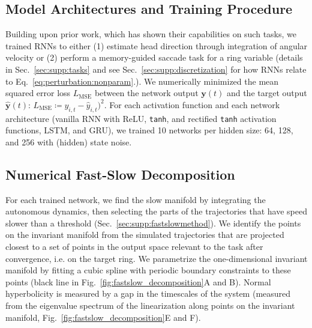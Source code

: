\documentclass{article} %
\newcounter{ct}
\theoremstyle{definition}
\theoremstyle{remark}
\begin{document}
\subsection{Model Architectures and Training Procedure}
Building upon prior work, which has shown their capabilities on such tasks, we trained RNNs to either
(1) estimate head direction through integration of angular velocity \citep{cueva2019headdirection,cueva2021continuous}
or (2) perform a memory-guided saccade task for a ring variable \citep{wimmer2014,xie2022neural} (details in Sec.~\ref{sec:supp:tasks} and see Sec.~\ref{sec:supp:discretization} for how RNNs relate to Eq.~\ref{eq:perturbation:nonparam}.).
We numerically minimized the mean squared error loss \(L_{\operatorname{MSE}}\)  between the network output \(\mathbf{y}(t)\) and the target output \(\hat{\mathbf{y}}(t)\):
\(L_{\operatorname{MSE}} \coloneqq y_{i, t}-\hat y_{i, t})^{2}\).
For each activation function and each network architecture (vanilla RNN with ReLU, \texttt{tanh}, and rectified \texttt{tanh} activation functions, LSTM, and GRU), we trained 10 networks per hidden size: 64, 128, and 256 with (hidden) state noise.

\subsection{Numerical Fast-Slow Decomposition}\label{sec:fastslowmethod}
For each trained network, we find the slow manifold by integrating the autonomous dynamics, then selecting the parts of the trajectories that have speed slower than a threshold (Sec.~\ref{sec:supp:fastslowmethod}).
We identify the points on the invariant manifold from the simulated trajectories that are projected closest to a set of points in the output space relevant to the task after convergence, i.e. on the target ring.
We parametrize the one-dimensional invariant manifold by fitting a cubic spline with periodic boundary constraints to these points (black line in Fig.~\ref{fig:fastslow_decomposition}A and B).
Normal hyperbolicity is measured by a gap in the timescales of the system (measured from the eigenvalue spectrum of the linearization along points on the invariant manifold, Fig.~\ref{fig:fastslow_decomposition}E and F).
\end{document}
